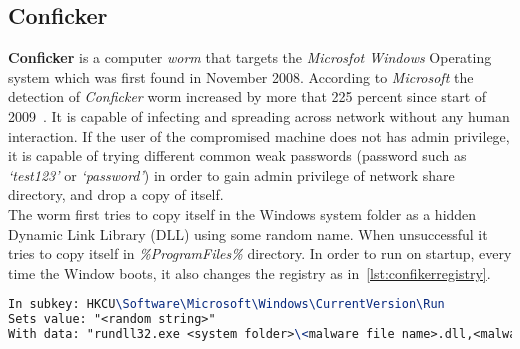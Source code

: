 \subsection{Conficker}
\label{sub:Conficker}
\textbf{Conficker} is a computer \emph{worm} that targets the \emph{Microsfot Windows} Operating system which was first found in November 2008.
According to \emph{Microsoft} the detection of \emph{Conficker} worm increased by more that 225 percent since start of 2009~\cite[]{conficker}.
It is capable of infecting and spreading across network without any human interaction.
If the user of the compromised machine does not has admin privilege, it is capable of trying different common weak passwords (password such as \emph{`test123'} or \emph{`password'}) in order to gain admin privilege of network share directory, and drop a copy of itself.\\
The worm first tries to copy itself in the Windows system folder as a hidden Dynamic Link Library (DLL) using some random name. When unsuccessful it tries to copy itself in \emph{\%ProgramFiles\%} directory.
In order to run on startup, every time the Window boots, it also changes the registry as in~\autoref{lst:confikerregistry}.
\begin{lstlisting}[language=TeX,caption={Registry key created by Confiker worm for autostart},label={lst:confikerregistry}]
In subkey: HKCU\Software\Microsoft\Windows\CurrentVersion\Run
Sets value: "<random string>"
With data: "rundll32.exe <system folder>\<malware file name>.dll,<malware parameters>"
\end{lstlisting}
